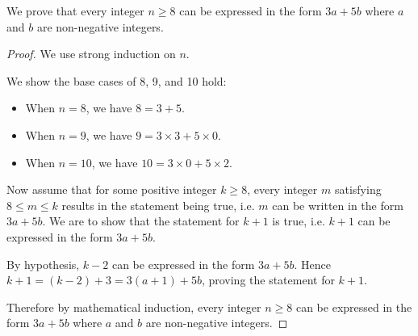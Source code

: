 \begin{example}
    We prove that every integer $n \geq 8$ can be expressed in the form $3a + 5b$ where $a$ and $b$ are non-negative integers.
    \begin{proof}
        We use strong induction on $n$.

        We show the base cases of 8, 9, and 10 hold:
        \begin{itemize}
            \item When $n = 8$, we have $8 = 3 + 5$.
            \item When $n = 9$, we have $9 = 3 \times 3 + 5 \times 0$.
            \item When $n = 10$, we have $10 = 3 \times 0 + 5 \times 2$.
        \end{itemize}

        Now assume that for some positive integer $k \geq 8$, every integer $m$ satisfying $8 \leq m \leq k$ results in the statement being true, i.e. $m$ can be written in the form $3a + 5b$. We are to show that the statement for $k+1$ is true, i.e. $k+1$ can be expressed in the form $3a + 5b$.

        By hypothesis, $k - 2$ can be expressed in the form $3a+5b$. Hence $k+1 = (k-2) + 3 = 3(a+1) + 5b$, proving the statement for $k+1$.

        Therefore by mathematical induction, every integer $n \geq 8$ can be expressed in the form $3a + 5b$ where $a$ and $b$ are non-negative integers.
    \end{proof}
\end{example}


